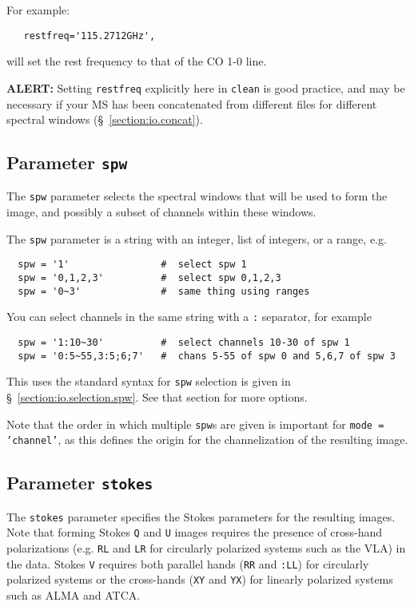 For example:
\small
\begin{verbatim}
   restfreq='115.2712GHz',
\end{verbatim}
\normalsize
will set the rest frequency to that of the CO 1-0 line.

{\bf ALERT:} Setting {\tt restfreq} explicitly here in
{\tt clean} is good practice, and may be necessary if your MS has
been concatenated from different files for different spectral
windows (\S~\ref{section:io.concat}).

\subsection{Parameter {\tt spw} }
\label{section:im.pars.spw}

The {\tt spw} parameter selects the spectral windows that will
be used to form the image, and possibly a subset of channels
within these windows.

The {\tt spw} parameter is a string with an integer, list
of integers, or a range, e.g.  
\small
\begin{verbatim}
  spw = '1'                #  select spw 1
  spw = '0,1,2,3'          #  select spw 0,1,2,3
  spw = '0~3'              #  same thing using ranges
\end{verbatim}
\normalsize
You can select channels in the same string with a {\tt :} separator,
for example
\small
\begin{verbatim}
  spw = '1:10~30'          #  select channels 10-30 of spw 1
  spw = '0:5~55,3:5;6;7'   #  chans 5-55 of spw 0 and 5,6,7 of spw 3
\end{verbatim}
\normalsize
This uses the standard syntax for {\tt spw} selection is given in 
\S~\ref{section:io.selection.spw}.  See that section for more
options.

Note that the order in which multiple {\tt spw}s are given is
important for {\tt mode = 'channel'}, as
this defines the origin for the channelization of the resulting
image.

\subsection{Parameter {\tt stokes} }
\label{section:im.pars.stokes}

The {\tt stokes} parameter specifies the Stokes parameters for the
resulting images.  Note that forming Stokes {\tt Q} and {\tt U} images
requires the presence of
cross-hand polarizations (e.g. {\tt RL} and {\tt LR} for circularly
polarized systems such as the VLA) in the data.  
Stokes {\tt V} requires both parallel
hands ({\tt RR} and {\tt :LL}) for circularly polarized systems or
the cross-hands ({\tt XY} and {\tt YX}) for linearly polarized systems
such as ALMA and ATCA.

